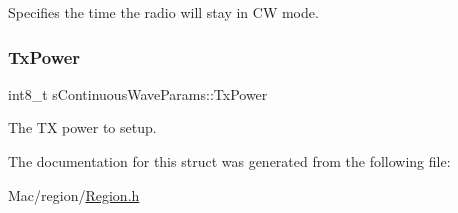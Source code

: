Specifies the time the radio will stay in CW mode. \mbox{\label{structsContinuousWaveParams_aea26241974fa9dac3fa5356a932eedec}} 
\subsubsection{\texorpdfstring{Tx\+Power}{TxPower}}
{\footnotesize\ttfamily int8\+\_\+t s\+Continuous\+Wave\+Params\+::\+Tx\+Power}

The TX power to setup. 

The documentation for this struct was generated from the following file\+:\begin{DoxyCompactItemize}
\item 
Mac/region/\hyperlink{Region_8h}{Region.\+h}\end{DoxyCompactItemize}
